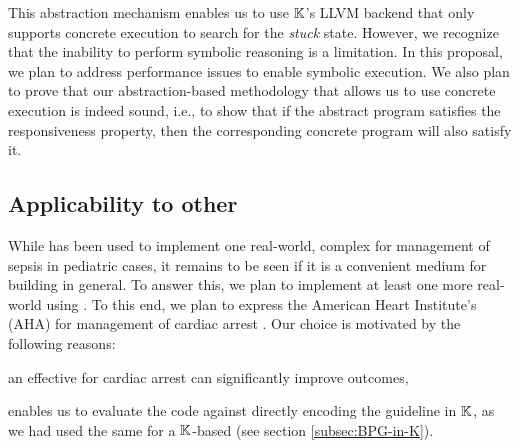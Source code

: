 This abstraction mechanism enables us to use $\mathbb{K}$'s LLVM backend
that only supports concrete execution to search for the \emph{stuck}
state. However, we recognize that the inability to perform symbolic
reasoning is a limitation. In this proposal, we plan to
address performance issues to enable symbolic execution.
We also plan to prove that our abstraction-based methodology
that allows us to use concrete execution is indeed sound, i.e.,
to show that if the abstract program satisfies the responsiveness
property, then the corresponding concrete program will also satisfy it.


\subsection{Applicability to other \CDSSs{}}\label{subsec:applicability}

While \MediK{} has been used to implement one real-world, complex
\CDSSs{} for management of sepsis in pediatric cases, it remains
to be seen if it is a convenient medium for building \CDSSs{} in general.
To answer this, we plan to implement at least one more real-world \CDSS{}
using \MediK{}. To this end, we plan to express the American Heart Institute's
(AHA) \BPG{} for management of cardiac arrest \cite{AHAUrl}. Our choice
is motivated by the following reasons:
\begin{enumerate*}[label=(\roman*)]
  \item an effective \CDSS{} for cardiac arrest can significantly improve
    outcomes,
  \item enables us to evaluate the \MediK{} code against directly encoding
    the guideline in $\mathbb{K}$, as we had used the same \BPG{} for a $\mathbb{K}$-based \CDSSs{}
    (see section \ref{subsec:BPG-in-K}).
\end{enumerate*}

